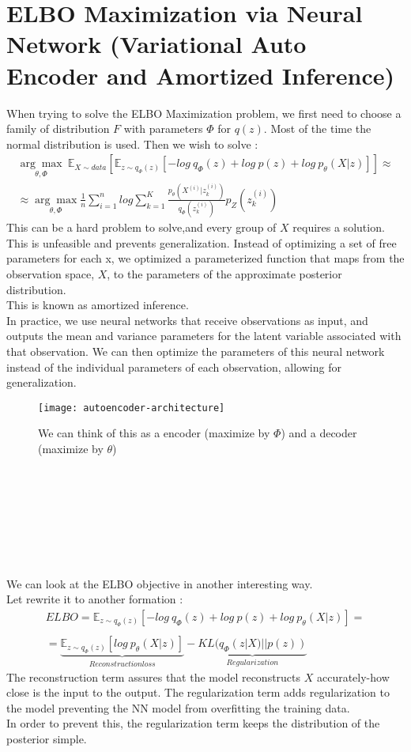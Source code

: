 \section*{ELBO Maximization via Neural Network (Variational Auto Encoder and Amortized Inference)}
When trying to solve the ELBO Maximization problem, we first need to choose a family of distribution $F$ with parameters $\Phi$ for $q(z)$. Most of the time the normal distribution is used. Then we wish to solve : 
\begin{gather*}
\underset{\theta, \Phi}{\arg\max} \ \mathbb{E}_{X\sim data}[\mathbb{E}_{z \sim q_{\Phi}(z)}[-log \ q_{\Phi}(z) + log \ p(z) + log \ p_{\theta}(X|z)]] \approx \\
\approx \underset{\theta, \Phi}{\arg\max} \frac{1}{n}\sum_{i=1}^{n}log \sum_{k=1}^{K}\frac{p_{\theta}(X^{(i)}|z_{k}^{(i)})}{q_{\Phi}(z_{k}^{(i)})}p_{Z}(z_{k}^{(i)})
\end{gather*}
This can be a hard problem to solve,and every group of $X$ requires a solution. This is unfeasible and prevents generalization. Instead of optimizing a set of free parameters for each x, we optimized a parameterized function that maps from the observation space, $X$, to the parameters of the approximate posterior distribution.\\
This is known as amortized inference. \\
In practice, we use neural networks that receive observations as input, and outputs the mean and variance parameters for the latent variable associated with that observation. We can then optimize the parameters of this neural network instead of the individual parameters of each observation, allowing for generalization.
\begin{figure}[t]
\texttt{[image: autoencoder-architecture]}
\caption{We can think of this as a encoder (maximize by $\Phi$) and a decoder (maximize by $\theta$)}
\centering
\end{figure}
\\ \\ \\ \\ \\ \\ \\
We can look at the ELBO objective in another interesting way.\\
Let rewrite it to another formation :
\begin{gather*}
ELBO=\mathbb{E}_{z \sim q_{\Phi}(z)}[-log \ q_{\Phi}(z) + log \ p(z) + log \ p_{\theta}(X|z)] = \\ \\
= \underbrace{\mathbb{E}_{z \sim q_{\Phi}(z)}[log \ p_{\theta}(X|z)]}_{Reconstruction loss} - \underbrace{KL(q_{\Phi}(z|X)||p(z))}_{Regularization}
\end{gather*}
The reconstruction term assures that the model reconstructs $X$ accurately-how close is the input to the output. The regularization term adds regularization to the model preventing the NN model from overfitting the training data.\\
In order to prevent this, the regularization term keeps the distribution of the posterior simple. \\ \\


